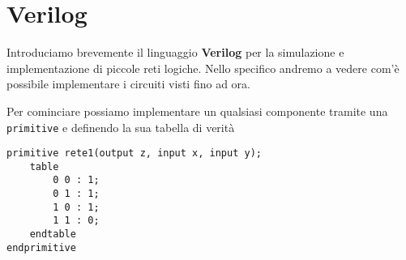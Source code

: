 \section{Verilog}
Introduciamo brevemente il linguaggio \textbf{Verilog} per la simulazione e implementazione di
piccole reti logiche. Nello specifico andremo a vedere com'è possibile implementare i circuiti
visti fino ad ora.

Per cominciare possiamo implementare un qualsiasi componente tramite una \verb|primitive| e
definendo la sua tabella di verità

\begin{verbatim}
primitive rete1(output z, input x, input y);
	table
		0 0 : 1;
		0 1 : 1;
		1 0 : 1;
		1 1 : 0;
	endtable
endprimitive
\end{verbatim}